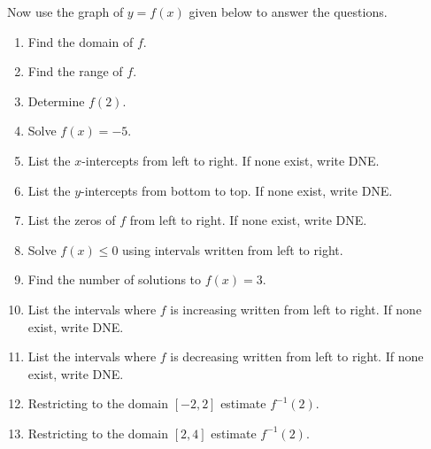 \documentclass{ximera}
\author{Carl Stitz \and Jeff Zeager \and Matthew Carr}
\begin{document}
\begin{exercise}




Now use the graph of $y = f(x)$ given below to answer the questions.
\begin{image}
\end{image}
\begin{multicols}{2}
\begin{enumerate}
\item  Find the domain of $f$. \label{usesecondfuncgraphfirst}
\item  Find the range of $f$.
\item  Determine $f(2)$.
\item  Solve $f(x) = -5$.
\item  List the $x$-intercepts from left to right. If none exist, write DNE.
\item  List the $y$-intercepts from bottom to top. If none exist, write DNE.
\item  List the zeros of $f$ from left to right. If none exist, write DNE.
\item  Solve $f(x) \leq 0$ using intervals written from left to right.
\item  Find the number of solutions to $f(x) = 3$.
\item  List the intervals where $f$ is increasing written from left to right. If none exist, write DNE.
\item  List the intervals where $f$ is decreasing written from left to right. If none exist, write DNE.
\item  Restricting to the domain $[-2,2]$ estimate $f^{-1}(2)$.
\item  Restricting to the domain $[2,4]$ estimate $f^{-1}(2)$.
\end{enumerate}
\end{multicols}


\end{exercise}
\end{document}
